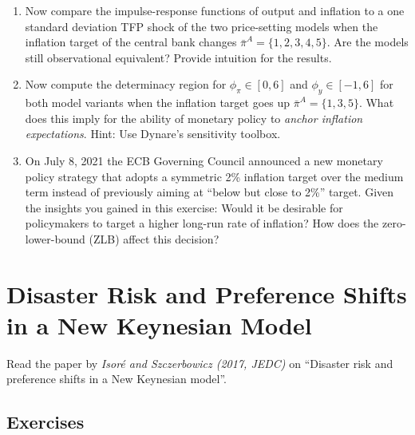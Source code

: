 \documentclass{article}
\numberwithin{equation}{section}
\begin{document}
\begin{enumerate}
\item Now compare the impulse-response functions of output and inflation to a one standard deviation TFP shock of the two price-setting models
  when the inflation target of the central bank changes \(\bar{\pi}^{A} = \{1, 2, 3, 4, 5\} \).
Are the models still observational equivalent?
Provide intuition for the results.

\item Now compute the determinacy region for \(\phi_\pi \in [0,6]\) and \(\phi_y \in [-1,6]\) for both model variants
  when the inflation target goes up \(\bar{\pi}^{A} = \{1, 3, 5\} \).
What does this imply for the ability of monetary policy to \emph{anchor inflation expectations}.
Hint: Use Dynare's sensitivity toolbox.

\item On July 8, 2021 the ECB Governing Council announced a new monetary policy strategy
  that adopts a symmetric 2\% inflation target over the medium term instead of previously aiming at ``below but close to 2\%'' target.
Given the insights you gained in this exercise:
Would it be desirable for policymakers to target a higher long-run rate of inflation?
How does the zero-lower-bound (ZLB) affect this decision?

\end{enumerate}

\newpage

\section[Disaster Risk and Preference Shifts]{Disaster Risk and Preference Shifts in a New Keynesian Model\label{ex:DisasterRisk}}
Read the paper by \emph{Isoré and Szczerbowicz (2017, JEDC)} on ``Disaster risk and preference shifts in a New Keynesian model''.

\subsection*{Exercises}
\end{document}
